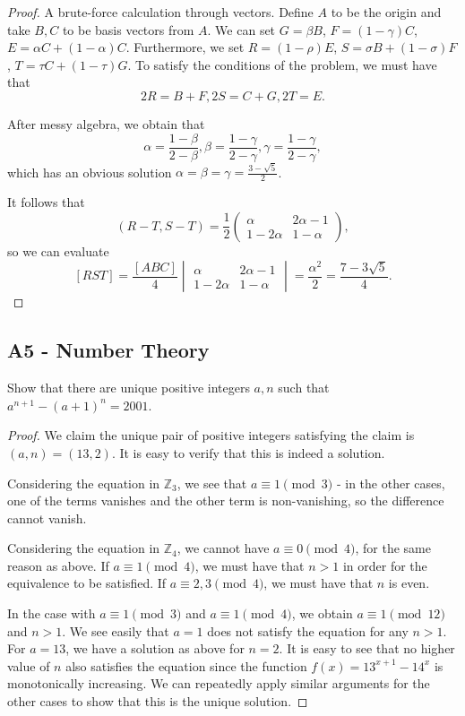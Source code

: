 \documentclass[11pt]{scrartcl}
\newcommand{\Z}{\mathbb{Z}}
\newcommand{\<}{\langle}
\renewcommand{\>}{\rangle}
\begin{document}
\begin{proof}
A brute-force calculation through vectors.  Define $A$ to be the origin and take $B, C$ to be basis vectors from $A$.  We can set $G = \beta B$, $F = (1 - \gamma) C$, $E = \alpha C + (1 - \alpha) C$.  Furthermore, we set $R = (1 - \rho) E$, $S = \sigma B + (1 - \sigma )F$, $T = \tau C + (1 - \tau) G$.  To satisfy the conditions of the problem, we must have that 
$$2R = B+F, 2S = C + G, 2T =  E.$$

After messy algebra, we obtain that 
$$\alpha = \frac{1 - \beta}{2 - \beta}, \beta = \frac{1 - \gamma}{2 - \gamma}, \gamma = \frac{1 - \gamma}{2 - \gamma},$$
which has an obvious solution $\alpha = \beta = \gamma = \frac{3 - \sqrt{5}}{2}$.  

It follows that 
$$(R-T, S- T) = \frac{1}{2}\begin{pmatrix} \alpha & 2\alpha - 1 \\ 1 - 2\alpha & 1 - \alpha \end{pmatrix},$$
so we can evaluate 
$$[RST] = \frac{[ABC]}{4} \begin{vmatrix}
 \alpha & 2\alpha - 1 \\ 1 - 2\alpha & 1 - \alpha
\end{vmatrix}  = \frac{\alpha^2}{2} = \frac{7 - 3\sqrt{5}}{4}.$$
\end{proof}
\subsection{A5 - Number Theory}
 Show that there are unique positive integers $a, n$ such that $a^{n+1} - (a+1)^n = 2001$.

\begin{proof}
We claim the unique pair of positive integers satisfying the claim is $(a, n) = (13, 2)$.  It is easy to verify that this is indeed a solution.  

Considering the equation in $\Z_3$, we see that $a \equiv 1 \pmod{3}$ - in the other cases, one of the terms vanishes and the other term is non-vanishing, so the difference cannot vanish.  

Considering the equation in $\Z_4$, we cannot have $a \equiv 0 \pmod{4}$, for the same reason as above.  If $a \equiv 1 \pmod{4}$, we must have that $n > 1$ in order for the equivalence to be satisfied.  If $a \equiv 2, 3 \pmod{4}$, we must have that $n$ is even.  

In the case with $a \equiv 1 \pmod{3}$ and $a \equiv 1 \pmod{4}$, we obtain $a \equiv 1 \pmod{12}$ and $n > 1$.   We see easily that $a = 1$ does not satisfy the equation for any $n > 1$.  For $a = 13$, we have a solution as above for $n = 2$.  It is easy to see that no higher value of $n$ also satisfies the equation since the function $f(x) = 13^{x + 1} - 14^x$ is monotonically increasing.   We can repeatedly apply similar arguments for the other cases to show that this is the unique solution.  
\end{proof}
\end{document}
